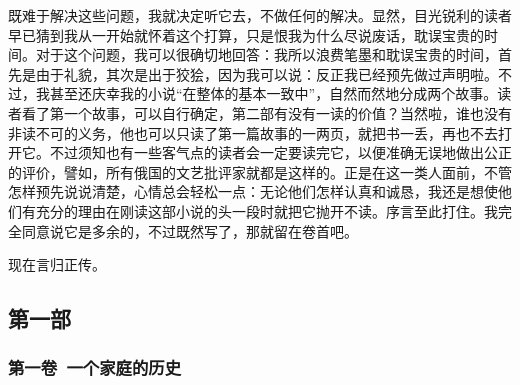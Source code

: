 \par 既难于解决这些问题，我就决定听它去，不做任何的解决。显然，目光锐利的读者早已猜到我从一开始就怀着这个打算，只是恨我为什么尽说废话，耽误宝贵的时间。对于这个问题，我可以很确切地回答：我所以浪费笔墨和耽误宝贵的时间，首先是由于礼貌，其次是出于狡狯，因为我可以说：反正我已经预先做过声明啦。不过，我甚至还庆幸我的小说“在整体的基本一致中”，自然而然地分成两个故事。读者看了第一个故事，可以自行确定，第二部有没有一读的价值？当然啦，谁也没有非读不可的义务，他也可以只读了第一篇故事的一两页，就把书一丢，再也不去打开它。不过须知也有一些客气点的读者会一定要读完它，以便准确无误地做出公正的评价，譬如，所有俄国的文艺批评家就都是这样的。正是在这一类人面前，不管怎样预先说说清楚，心情总会轻松一点：无论他们怎样认真和诚恳，我还是想使他们有充分的理由在刚读这部小说的头一段时就把它抛开不读。序言至此打住。我完全同意说它是多余的，不过既然写了，那就留在卷首吧。
\par 现在言归正传。



\subsection*{第一部}


\subsubsection*{第一卷\ 一个家庭的历史}


